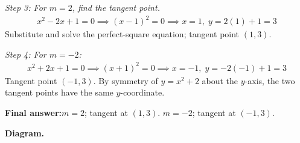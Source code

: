 \documentclass[11pt]{article}
\begin{document}
\textit{Step 3: For \( m = 2 \), find the tangent point.}
\[\begin{gathered}
x^2 - 2x + 1 = 0 \implies (x - 1)^2 = 0 \implies x = 1, \; y = 2(1) + 1 = 3
\end{gathered}\]
Substitute and solve the perfect-square equation; tangent point \( (1, 3) \).

\textit{Step 4: For \( m = -2 \):}
\[\begin{gathered}
x^2 + 2x + 1 = 0 \implies (x + 1)^2 = 0 \implies x = -1, \; y = -2(-1) + 1 = 3
\end{gathered}\]
Tangent point \( (-1, 3) \). By symmetry of \( y = x^2 + 2 \) about the \( y \)-axis, the two tangent points have the same \( y \)-coordinate.

\begin{answerbox}
\textbf{Final answer:}\quad \(\displaystyle m = 2\); tangent at \(\displaystyle (1, 3)\). \(\displaystyle m = -2\); tangent at \(\displaystyle (-1, 3)\).
\end{answerbox}
\textbf{Diagram.}
\end{document}
